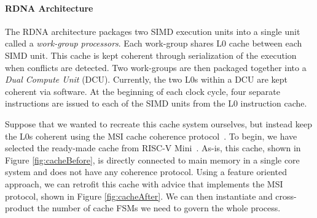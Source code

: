 \documentclass[sigplan,anonymous,review]{acmart}
\begin{document}
\paragraph{RDNA Architecture} The RDNA architecture packages two SIMD execution units into a single unit called a \textit{work-group processors}. Each work-group shares L0 cache between each SIMD unit. This cache is kept coherent through serialization of the execution when conflicts are detected. Two work-groups are then packaged together into a \textit{Dual Compute Unit} (DCU). Currently, the two L0s within a DCU are kept coherent via software. At the beginning of each clock cycle, four separate instructions are issued to each of the SIMD units from the L0 instruction cache.

Suppose that we wanted to recreate this cache system ourselves, but instead keep the L0s coherent using the MSI cache coherence protocol~\cite{}. To begin, we have selected the ready-made cache from RISC-V Mini~\cite{}. As-is, this cache, shown in Figure \ref{fig:cacheBefore}, is directly connected to main memory in a single core system and does not have any coherence protocol. Using a feature oriented approach, we can retrofit this cache with advice that implements the MSI protocol, shown in Figure \ref{fig:cacheAfter}. We can then instantiate and cross-product the number of cache FSMs we need to govern the whole process. 
\end{document}
